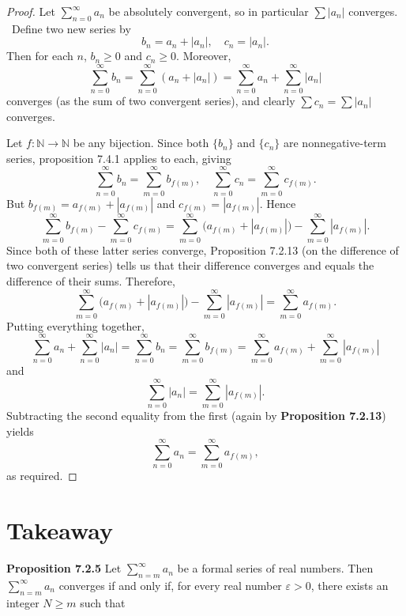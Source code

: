 \documentclass{article}
\begin{document}
\begin{proof}
    Let $\sum_{n=0}^\infty a_n$ be absolutely convergent, so in particular $\sum |a_n|$ converges. \
    Define two new series by
    \[
        b_n = a_n + |a_n|, \quad c_n = |a_n|.
    \]
    Then for each \( n \), \( b_n \geq 0 \) and \( c_n \geq 0 \).
    Moreover,
    \[
        \sum_{n=0}^\infty b_n = \sum_{n=0}^\infty (a_n + |a_n|) = \sum_{n=0}^\infty a_n + \sum_{n=0}^\infty |a_n|
    \]
    converges (as the sum of two convergent series), and clearly \( \sum c_n = \sum |a_n| \) converges.

    Let \( f: \mathbb{N} \to \mathbb{N} \) be any bijection.
    Since both \( \{b_n\} \) and \( \{c_n\} \) are nonnegative-term series,
    proposition 7.4.1 applies to each, giving
    \[
        \sum_{n=0}^\infty b_n = \sum_{m=0}^\infty b_{f(m)}, \quad \sum_{n=0}^\infty c_n = \sum_{m=0}^\infty c_{f(m)}.
    \]
    But \( b_{f(m)} = a_{f(m)} + |a_{f(m)}| \) and \( c_{f(m)} = |a_{f(m)}| \).
    Hence
    \[
        \sum_{m=0}^\infty b_{f(m)} - \sum_{m=0}^\infty c_{f(m)} = \sum_{m=0}^\infty \bigl(a_{f(m)} + |a_{f(m)}|\bigr) - \sum_{m=0}^\infty |a_{f(m)}|.
    \]
    Since both of these latter series converge,
    Proposition 7.2.13 (on the difference of two convergent series)
    tells us that their difference converges and equals the difference of their sums.
    Therefore,
    \[
        \sum_{m=0}^\infty \bigl(a_{f(m)} + |a_{f(m)}|\bigr) - \sum_{m=0}^\infty |a_{f(m)}| = \sum_{m=0}^\infty a_{f(m)}.
    \]
    Putting everything together,
    \[
        \sum_{n=0}^\infty a_n + \sum_{n=0}^\infty |a_n| = \sum_{n=0}^\infty b_n = \sum_{m=0}^\infty b_{f(m)} = \sum_{m=0}^\infty a_{f(m)} + \sum_{m=0}^\infty |a_{f(m)}|
    \]
    and
    \[
        \sum_{n=0}^\infty |a_n| = \sum_{m=0}^\infty |a_{f(m)}|.
    \]
    Subtracting the second equality from the first (again by \textbf{Proposition 7.2.13}) yields
    \[
        \sum_{n=0}^\infty a_n = \sum_{m=0}^\infty a_{f(m)},
    \]
    as required.
\end{proof}




\section{Takeaway}
\textbf{Proposition 7.2.5} Let $\sum_{n=m}^{\infty} a_n$ be a formal series of real numbers.
Then $\sum_{n=m}^{\infty} a_n$ converges if and only if, for every real number
$\varepsilon > 0$, there exists an integer $N \geq m$ such that
\end{document}

